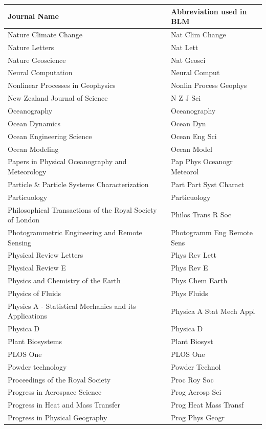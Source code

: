 \begin{longtable}{| p{8 cm} | p{6 cm} |}
\hline
Journal Name & Abbreviation used in BLM \\
\hline
Nature Climate Change & Nat Clim Change \\
Nature Letters & Nat Lett \\
Nature Geoscience & Nat Geosci \\
Neural Computation & Neural Comput \\
Nonlinear Processes in Geophysics & Nonlin Process Geophys \\
New Zealand Journal of Science & N Z J Sci \\
\hline
Oceanography & Oceanography \\
Ocean Dynamics & Ocean Dyn \\
Ocean Engineering Science & Ocean Eng Sci \\
Ocean Modeling & Ocean Model \\
\hline
Papers in Physical Oceanography and Meteorology & Pap Phys Oceanogr Meteorol \\
Particle \& Particle Systems Characterization & Part Part Syst Charact \\
Particuology & Particuology \\
Philosophical Transactions of the Royal Society of London & Philos Trans R Soc \\
Photogrammetric Engineering and Remote Sensing & Photogramm Eng Remote Sens \\
Physical Review Letters & Phys Rev Lett \\
Physical Review E & Phys Rev E \\
Physics and Chemistry of the Earth & Phys Chem Earth \\
Physics of Fluids & Phys Fluids \\
Physics A - Statistical Mechanics and its Applications & Physica A Stat Mech Appl \\
Physica D & Physica D \\
Plant Biosystems & Plant Biosyst \\
PLOS One & PLOS One \\
Powder technology & Powder Technol \\
Proceedings of the Royal Society & Proc Roy Soc \\
Progress in Aerospace Science & Prog Aerosp Sci \\
Progress in Heat and Mass Transfer & Prog Heat Mass Transf \\
Progress in Physical Geography & Prog Phys Geogr \\

\end{longtable}
